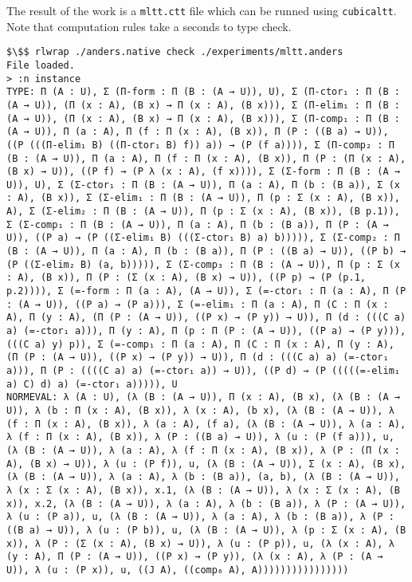 The result of the work is a \lstinline{mltt.ctt} file which can be runned using \lstinline{cubicaltt}.
Note that computation rules take a seconds to type check.

\begin{lstlisting}
$\$$ rlwrap ./anders.native check ./experiments/mltt.anders
File loaded.
> :n instance
TYPE: Π (A : U), Σ (Π-form : Π (B : (A → U)), U), Σ (Π-ctor₁ : Π (B : (A → U)), (Π (x : A), (B x) → Π (x : A), (B x))), Σ (Π-elim₁ : Π (B : (A → U)), (Π (x : A), (B x) → Π (x : A), (B x))), Σ (Π-comp₁ : Π (B : (A → U)), Π (a : A), Π (f : Π (x : A), (B x)), Π (P : ((B a) → U)), ((P (((Π-elim₁ B) ((Π-ctor₁ B) f)) a)) → (P (f a)))), Σ (Π-comp₂ : Π (B : (A → U)), Π (a : A), Π (f : Π (x : A), (B x)), Π (P : (Π (x : A), (B x) → U)), ((P f) → (P λ (x : A), (f x)))), Σ (Σ-form : Π (B : (A → U)), U), Σ (Σ-ctor₁ : Π (B : (A → U)), Π (a : A), Π (b : (B a)), Σ (x : A), (B x)), Σ (Σ-elim₁ : Π (B : (A → U)), Π (p : Σ (x : A), (B x)), A), Σ (Σ-elim₂ : Π (B : (A → U)), Π (p : Σ (x : A), (B x)), (B p.1)), Σ (Σ-comp₁ : Π (B : (A → U)), Π (a : A), Π (b : (B a)), Π (P : (A → U)), ((P a) → (P ((Σ-elim₁ B) (((Σ-ctor₁ B) a) b))))), Σ (Σ-comp₂ : Π (B : (A → U)), Π (a : A), Π (b : (B a)), Π (P : ((B a) → U)), ((P b) → (P ((Σ-elim₂ B) (a, b))))), Σ (Σ-comp₃ : Π (B : (A → U)), Π (p : Σ (x : A), (B x)), Π (P : (Σ (x : A), (B x) → U)), ((P p) → (P (p.1, p.2)))), Σ (=-form : Π (a : A), (A → U)), Σ (=-ctor₁ : Π (a : A), Π (P : (A → U)), ((P a) → (P a))), Σ (=-elim₁ : Π (a : A), Π (C : Π (x : A), Π (y : A), (Π (P : (A → U)), ((P x) → (P y)) → U)), Π (d : (((C a) a) (=-ctor₁ a))), Π (y : A), Π (p : Π (P : (A → U)), ((P a) → (P y))), (((C a) y) p)), Σ (=-comp₁ : Π (a : A), Π (C : Π (x : A), Π (y : A), (Π (P : (A → U)), ((P x) → (P y)) → U)), Π (d : (((C a) a) (=-ctor₁ a))), Π (P : ((((C a) a) (=-ctor₁ a)) → U)), ((P d) → (P (((((=-elim₁ a) C) d) a) (=-ctor₁ a))))), U
NORMEVAL: λ (A : U), (λ (B : (A → U)), Π (x : A), (B x), (λ (B : (A → U)), λ (b : Π (x : A), (B x)), λ (x : A), (b x), (λ (B : (A → U)), λ (f : Π (x : A), (B x)), λ (a : A), (f a), (λ (B : (A → U)), λ (a : A), λ (f : Π (x : A), (B x)), λ (P : ((B a) → U)), λ (u : (P (f a))), u, (λ (B : (A → U)), λ (a : A), λ (f : Π (x : A), (B x)), λ (P : (Π (x : A), (B x) → U)), λ (u : (P f)), u, (λ (B : (A → U)), Σ (x : A), (B x), (λ (B : (A → U)), λ (a : A), λ (b : (B a)), (a, b), (λ (B : (A → U)), λ (x : Σ (x : A), (B x)), x.1, (λ (B : (A → U)), λ (x : Σ (x : A), (B x)), x.2, (λ (B : (A → U)), λ (a : A), λ (b : (B a)), λ (P : (A → U)), λ (u : (P a)), u, (λ (B : (A → U)), λ (a : A), λ (b : (B a)), λ (P : ((B a) → U)), λ (u : (P b)), u, (λ (B : (A → U)), λ (p : Σ (x : A), (B x)), λ (P : (Σ (x : A), (B x) → U)), λ (u : (P p)), u, (λ (x : A), λ (y : A), Π (P : (A → U)), ((P x) → (P y)), (λ (x : A), λ (P : (A → U)), λ (u : (P x)), u, ((J A), ((comp₆ A), A))))))))))))))))
\end{lstlisting}

